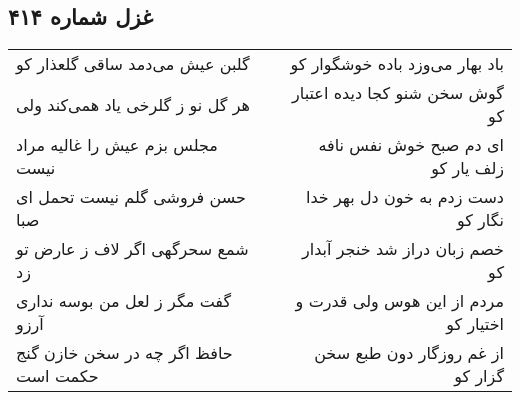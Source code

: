 \begin{center}
\section*{غزل شماره ۴۱۴}
\label{sec:sh414}
\begin{longtable}{l p{0.5cm} r}
گلبن عیش می‌دمد ساقی گلعذار کو
&&
باد بهار می‌وزد باده خوشگوار کو
\\
هر گل نو ز گلرخی یاد همی‌کند ولی
&&
گوش سخن شنو کجا دیده اعتبار کو
\\
مجلس بزم عیش را غالیه مراد نیست
&&
ای دم صبح خوش نفس نافه زلف یار کو
\\
حسن فروشی گلم نیست تحمل ای صبا
&&
دست زدم به خون دل بهر خدا نگار کو
\\
شمع سحرگهی اگر لاف ز عارض تو زد
&&
خصم زبان دراز شد خنجر آبدار کو
\\
گفت مگر ز لعل من بوسه نداری آرزو
&&
مردم از این هوس ولی قدرت و اختیار کو
\\
حافظ اگر چه در سخن خازن گنج حکمت است
&&
از غم روزگار دون طبع سخن گزار کو
\\
\end{longtable}
\end{center}
